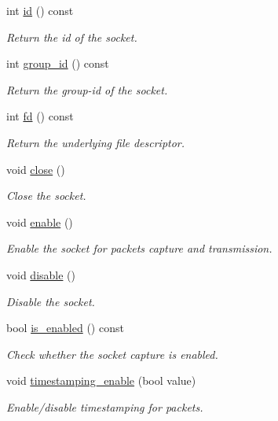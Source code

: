 \begin{DoxyCompactItemize}
int \hyperlink{classpfq_1_1socket_af3f79e9a42964907acd581d35d42da00}{id} () const 
\begin{DoxyCompactList}\small\item\em Return the id of the socket. \end{DoxyCompactList}\item 
int \hyperlink{classpfq_1_1socket_a0b82186997f22efffd336b09b19a806d}{group\+\_\+id} () const 
\begin{DoxyCompactList}\small\item\em Return the group-\/id of the socket. \end{DoxyCompactList}\item 
int \hyperlink{classpfq_1_1socket_ad4f1a171d31215afd6aad769a5e4b004}{fd} () const 
\begin{DoxyCompactList}\small\item\em Return the underlying file descriptor. \end{DoxyCompactList}\item 
void \hyperlink{classpfq_1_1socket_a4c179188ea8fceeb5fd47d52f93c6bda}{close} ()
\begin{DoxyCompactList}\small\item\em Close the socket. \end{DoxyCompactList}\item 
void \hyperlink{classpfq_1_1socket_a5b25af762946405695f4192b08c04146}{enable} ()
\begin{DoxyCompactList}\small\item\em Enable the socket for packets capture and transmission. \end{DoxyCompactList}\item 
void \hyperlink{classpfq_1_1socket_ac7e918bff7d1672125a8549dae750dcc}{disable} ()
\begin{DoxyCompactList}\small\item\em Disable the socket. \end{DoxyCompactList}\item 
bool \hyperlink{classpfq_1_1socket_a0a80909f34ab601e4c96ee8cb28a3230}{is\+\_\+enabled} () const 
\begin{DoxyCompactList}\small\item\em Check whether the socket capture is enabled. \end{DoxyCompactList}\item 
void \hyperlink{classpfq_1_1socket_a39457556d11f22b1266abc8f9f7c46bd}{timestamping\+\_\+enable} (bool value)
\begin{DoxyCompactList}\small\item\em Enable/disable timestamping for packets. \end{DoxyCompactList}\item 

\end{DoxyCompactItemize}
